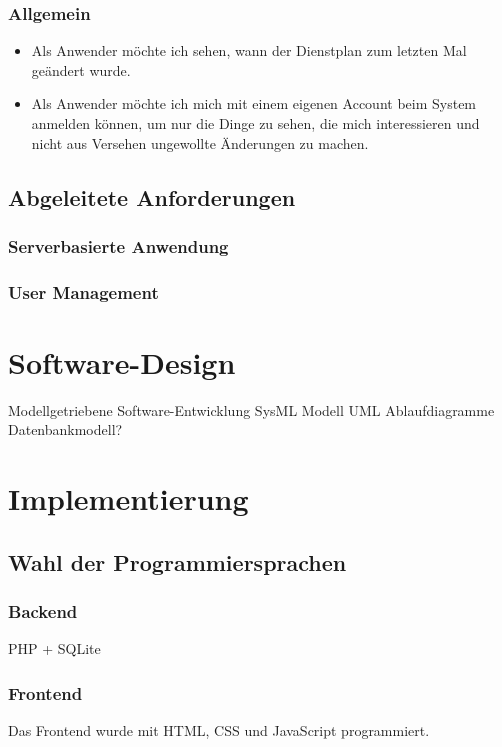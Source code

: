 \documentclass[12pt,a4paper,titlepage]{article} %
\begin{document}
\subsubsection{Allgemein}
\begin{itemize}
\item Als Anwender möchte ich sehen, wann der Dienstplan zum letzten Mal geändert wurde.
\item Als Anwender möchte ich mich mit einem eigenen Account beim System anmelden können, um nur die Dinge zu sehen, die mich interessieren und nicht aus Versehen ungewollte Änderungen zu machen.
\end{itemize}


\subsection{Abgeleitete Anforderungen}
\subsubsection{Serverbasierte Anwendung}
\subsubsection{User Management}


\section{Software-Design} %
Modellgetriebene Software-Entwicklung
SysML Modell
UML Ablaufdiagramme
Datenbankmodell?

\section{Implementierung}
\subsection{Wahl der Programmiersprachen}

\subsubsection{Backend}
PHP + SQLite

\subsubsection{Frontend}
Das Frontend wurde mit HTML, CSS und JavaScript programmiert.
\end{document}
